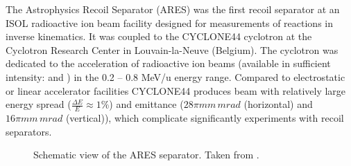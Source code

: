The Astrophysics Recoil Separator (ARES) was the first recoil separator at an ISOL radioactive ion beam facility designed for measurements of  reactions in inverse kinematics. It was coupled to the CYCLONE44 cyclotron at the Cyclotron Research Center in Louvain-la-Neuve (Belgium). The cyclotron was dedicated to the acceleration of radioactive ion beams (available in sufficient intensity:  and ) in the 0.2 -- 0.8 MeV/u energy range. Compared to electrostatic or linear accelerator facilities CYCLONE44 produces beam with relatively large energy spread ($\frac{\Delta{}E}{E} \approx 1\%$) and emittance ($28\pi \unit{mm\,mrad}$ (horizontal) and $16\pi \unit{mm\,mrad}$ (vertical)), which complicate significantly experiments with recoil separators.
\begin{figure}
\caption{Schematic view of the ARES separator. Taken from \cite{coud03}.}
\label{fig:ares}
\end{figure}
